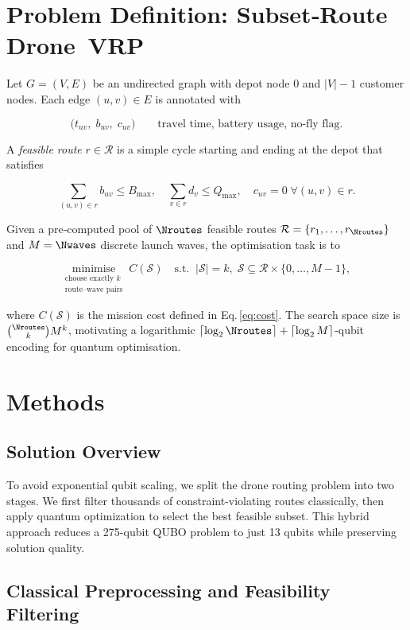 \section{Problem Definition: Subset‑Route Drone VRP}
\label{sec:problem}

Let $G=(V,E)$ be an undirected graph with depot node $0$ and
$|V|-1$ customer nodes.  Each edge $(u,v)\in E$ is annotated with

\[
\bigl(t_{uv}, \; b_{uv}, \; c_{uv}\bigr)
\qquad
\text{travel time, battery usage, no‑fly flag.}
\]

A \emph{feasible route} $r\in\mathcal{R}$ is a simple cycle starting and
ending at the depot that satisfies

\[
\textstyle
\sum_{(u,v)\in r} b_{uv} \le B_{\max},
\quad
\sum_{v\in r} d_v \le Q_{\max},
\quad
c_{uv}=0 \;\forall(u,v)\in r.
\]

Given a pre‑computed pool of $\Nroutes$ feasible routes
$\mathcal{R}=\{r_1,\dots,r_{\Nroutes}\}$ and $M=\Nwaves$ discrete launch
waves, the optimisation task is to

\[
\underset{
    \substack{\text{choose exactly }k\\ \text{route–wave pairs}}}
    {\text{minimise}}
\; C(\mathcal{S})
\quad
\text{s.t.}
\;\;
|\mathcal{S}|=k,\;
\mathcal{S}\subseteq\mathcal{R}\times\{0,\dots,M-1\},
\]

where $C(\mathcal{S})$ is the mission cost defined in
Eq.\,\eqref{eq:cost}.  The search space size is
${\small\binom{\Nroutes}{k} M^{k}}$, motivating a logarithmic
$\lceil\log_2\Nroutes\rceil+\lceil\log_2 M\rceil$‑qubit encoding for
quantum optimisation.

\section{Methods}
\subsection{Solution Overview}

To avoid exponential qubit scaling, we split the drone routing problem into two stages. We first filter thousands of constraint-violating routes classically, then apply quantum optimization to select the best feasible subset. This hybrid approach reduces a 275-qubit QUBO problem to just 13 qubits while preserving solution quality.

\subsection{Classical Preprocessing and Feasibility Filtering}

